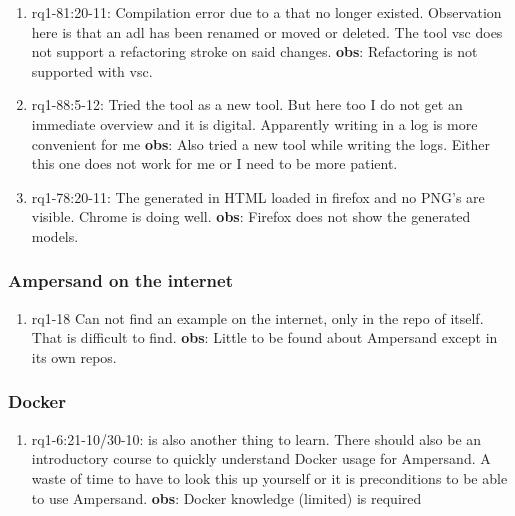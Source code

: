 \begin{enumerate}
    \item rq1-81:20-11: Compilation error due to a  that no longer existed.
    Observation here is that an adl has been renamed or moved or deleted.
    The tool \acrlong{vsc} does not support a refactoring stroke on said changes.
    \newline\textbf{obs}: Refactoring is not supported with \acrlong{vsc}.
    
    \item rq1-88:5-12: Tried the tool  as a new tool.
    But here too I do not get an immediate overview and it is digital.
    Apparently writing in a log is more convenient for me
    \newline\textbf{obs}: Also tried a new tool while writing the logs.
    Either this one does not work for me or I need to be more patient.
    
    \item rq1-78:20-11: The  generated in HTML loaded in firefox and no PNG's are visible.
    Chrome is doing well.
    \newline\textbf{obs}: Firefox does not show the generated models.

\end{enumerate}

\subsubsection{Ampersand on the internet}
\begin{comment}
plaats hier de afgehandelde items.
\end{comment}
\begin{enumerate}
    \item rq1-18 Can not find an example on the internet, only in the repo of  itself.
    That is difficult to find.
    \newline\textbf{obs}: Little to be found about Ampersand except in its own repos.
    
\end{enumerate}

\subsubsection{Docker}
\begin{comment}
plaats hier de afgehandelde items.
\end{comment}
\begin{enumerate}
    \item rq1-6:21-10/30-10:  is also another thing to learn.
    There should also be an introductory course to quickly understand Docker usage for Ampersand.
    A waste of time to have to look this up yourself or it is preconditions to be able to use Ampersand.
    \newline\textbf{obs}: Docker knowledge (limited) is required
    
\end{enumerate}

